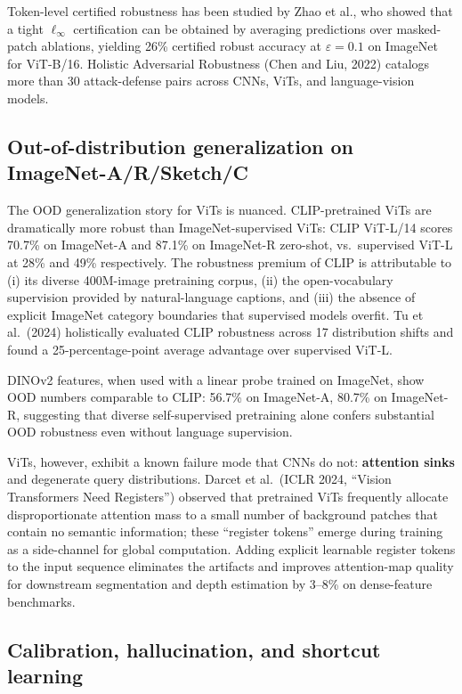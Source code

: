 Token-level certified robustness has been studied by Zhao et al., who showed that a tight \(\ell_\infty\) certification can be obtained by averaging predictions over masked-patch ablations, yielding 26\% certified robust accuracy at \(\varepsilon = 0.1\) on ImageNet for ViT-B/16. Holistic Adversarial Robustness (Chen and Liu, 2022) catalogs more than 30 attack-defense pairs across CNNs, ViTs, and language-vision models.

\subsection{Out-of-distribution generalization on ImageNet-A/R/Sketch/C}\label{out-of-distribution-generalization-on-imagenet-arsketchc}

The OOD generalization story for ViTs is nuanced. CLIP-pretrained ViTs are dramatically more robust than ImageNet-supervised ViTs: CLIP ViT-L/14 scores 70.7\% on ImageNet-A and 87.1\% on ImageNet-R zero-shot, vs.~supervised ViT-L at 28\% and 49\% respectively. The robustness premium of CLIP is attributable to (i) its diverse 400M-image pretraining corpus, (ii) the open-vocabulary supervision provided by natural-language captions, and (iii) the absence of explicit ImageNet category boundaries that supervised models overfit. Tu et al.~(2024) holistically evaluated CLIP robustness across 17 distribution shifts and found a 25-percentage-point average advantage over supervised ViT-L.

DINOv2 features, when used with a linear probe trained on ImageNet, show OOD numbers comparable to CLIP: 56.7\% on ImageNet-A, 80.7\% on ImageNet-R, suggesting that diverse self-supervised pretraining alone confers substantial OOD robustness even without language supervision.

ViTs, however, exhibit a known failure mode that CNNs do not: \textbf{attention sinks} and degenerate query distributions. Darcet et al.~(ICLR 2024, ``Vision Transformers Need Registers'') observed that pretrained ViTs frequently allocate disproportionate attention mass to a small number of background patches that contain no semantic information; these ``register tokens'' emerge during training as a side-channel for global computation. Adding explicit learnable register tokens to the input sequence eliminates the artifacts and improves attention-map quality for downstream segmentation and depth estimation by 3--8\% on dense-feature benchmarks.

\subsection{Calibration, hallucination, and shortcut learning}\label{calibration-hallucination-and-shortcut-learning}

